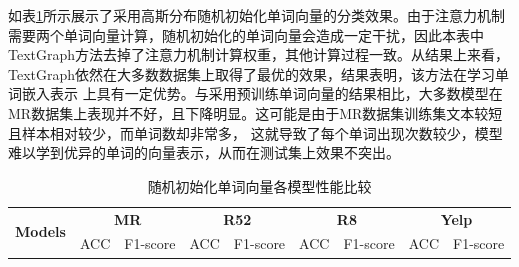 如表\ref{tab:without pre}所示展示了采用高斯分布随机初始化单词向量的分类效果。由于注意力机制需要两个单词向量计算，随机初始化的单词向量会造成一定干扰，因此本表中
TextGraph方法去掉了注意力机制计算权重，其他计算过程一致。从结果上来看，TextGraph依然在大多数数据集上取得了最优的效果，结果表明，该方法在学习单词嵌入表示
上具有一定优势。与采用预训练单词向量的结果相比，大多数模型在MR数据集上表现并不好，且下降明显。这可能是由于MR数据集训练集文本较短且样本相对较少，而单词数却非常多，
这就导致了每个单词出现次数较少，模型难以学到优异的单词的向量表示，从而在测试集上效果不突出。

\begin{table}[htb]
    \centering
    \caption{随机初始化单词向量各模型性能比较}
    \label{tab:without pre}
    \renewcommand\arraystretch{1}
    \renewcommand\tabcolsep{2mm}
    \begin{tabular}{lcccccccc}
    \hline
    \multirow{2}{*}{\textbf{Models}} & \multicolumn{2}{c}{\textbf{MR}} & \multicolumn{2}{c}{\textbf{R52}} & \multicolumn{2}{c}{\textbf{R8}} & \multicolumn{2}{c}{\textbf{Yelp}}                                \\
    \cline{2-9}
                            & \multicolumn{1}{c}{ACC} & \multicolumn{1}{c}{F1-score} & \multicolumn{1}{c}{ACC} & \multicolumn{1}{c}{F1-score} & \multicolumn{1}{c}{ACC} & \multicolumn{1}{c}{F1-score} & \multicolumn{1}{c}{ACC} & \multicolumn{1}{c}{F1-score}  \\
    \hline
    

\end{tabular}
\end{table}

